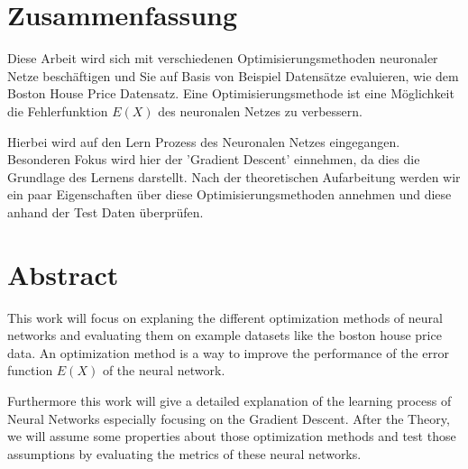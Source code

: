 \section*{Zusammenfassung}

Diese Arbeit wird sich mit verschiedenen Optimisierungsmethoden neuronaler Netze beschäftigen und Sie auf Basis von Beispiel Datensätze evaluieren, wie dem Boston House Price Datensatz.
Eine Optimisierungsmethode ist eine Möglichkeit die Fehlerfunktion $E(X)$ des neuronalen Netzes zu verbessern. 
 
Hierbei wird auf den Lern Prozess des Neuronalen Netzes eingegangen. Besonderen Fokus wird hier der 'Gradient Descent' einnehmen, da dies die Grundlage des Lernens darstellt.
Nach der theoretischen Aufarbeitung werden wir ein paar Eigenschaften über diese Optimisierungsmethoden annehmen und diese anhand der Test Daten überprüfen.

\section*{Abstract}

This work will focus on explaning the different optimization methods of neural networks and evaluating them
on example datasets like the boston house price data.
An optimization method is a way to improve the performance of the error 
function $E(X)$ of the neural network. 

Furthermore this work will give a detailed explanation of the learning process of Neural Networks
especially focusing on the Gradient Descent. 
After the Theory, we will assume some properties about those optimization methods and test those assumptions
by evaluating the metrics of these neural networks.

